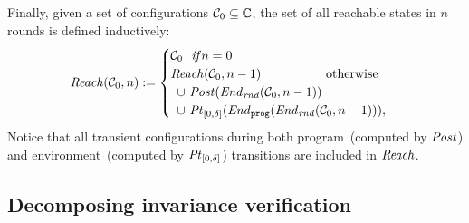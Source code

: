 Finally, given a set of configurations $\mathcal{C}_0\subseteq\mathbb{C}$,
the set of all reachable states in $n$ rounds is defined inductively:
\[
\Reach(\gset_0, n) :=
    \begin{cases}
        \gset_0  \ \ \mathit{if} n = 0 \\
        \Reach(\gset_0,n-1) \text{\hspace{1.8cm}otherwise} \\
        \hspace{0.5em} \cup\ \Post(\frontier(\gset_0,n-1))\\
        \hspace{0.5em} \cup\ \pt{0}{\delta}(\Final(\frontier(\gset_0,n-1))),\\
    \end{cases}
\]
Notice that all transient configurations during both program~(computed by $\mathit{Post}$) and environment~(computed by $\mathit{Pt}_{[0,\delta]}$) transitions are included in $\mathit{Reach}$.


\subsection{Decomposing invariance verification}
\label{sec:inv-po}

\newcommand{\Inv}{\mathit{inv}\xspace}

